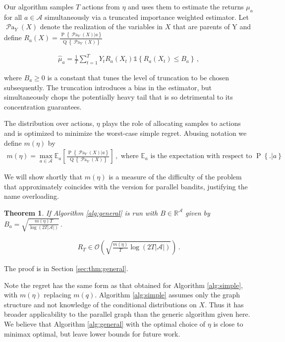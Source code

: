 \documentclass[11pt,a4paper,oneside]{book}
\newcommand{\simpleregret}{R_T}
\newcommand{\Q}[1]{\operatorname{Q}\left\{#1\right\}}
\newcommand{\EE}{\mathbb E}
\newcommand{\EEa}{\EE_a}
\newcommand{\Pn}[2]{\operatorname{P}\left\{#2|#1\right\}}
\newcommand{\calA}{\mathcal A}
\newcommand{\R}{\mathbb R}
\newcommand{\set}[1]{\left\{#1\right\}}
\newcommand{\ind}[1]{\mathds{1}\!\!\set{#1}}
\newcommand{\eq}[1]{\begin{align*}#1\end{align*}}
\newcommand{\bigo}[1]{\mathcal{O}\left( #1 \right)}
\newcommand{\parents}[1]{\operatorname{\mathcal{P}a}_{#1}}
\newtheorem{theorem}{Theorem}
\begin{document}
Our algorithm samples $T$ actions from $\eta$ and uses them to estimate the returns $\mu_a$ for all $a \in \calA$ simultaneously via a truncated importance weighted estimator. Let $\parents{Y}(X)$ denote the realization of the variables in $X$ that are parents of Y and define $R_a(X) = \frac{\Pn{a}{\parents{Y}(X)}}{\Q{\parents{Y}(X)}}$

\eq {
\hat \mu_a =  \frac{1}{T} \sum_{t=1}^T Y_t R_a(X_t)  \ind{R_a(X_t) \leq B_a}\,, 
} 

where $ B_a \geq 0$  is a constant that tunes the level of truncation to be chosen subsequently. The truncation introduces a bias in the estimator, but simultaneously chops the potentially heavy tail that is so detrimental to its concentration guarantees. 

The distribution over actions, $\eta$ plays the role of allocating samples to actions and is optimized to minimize the worst-case simple regret. Abusing notation we define $m(\eta)$ by
\eq{
m(\eta) = \max_{a \in \calA} \EEa\left[\frac{\Pn{a}{\parents{Y}(X)}}{\Q{\parents{Y}(X)}}\right]\,,\text{ where } \EEa \text{ is the expectation with respect to } \Pn{a}.
}

We will show shortly that $m(\eta)$ is a measure of the difficulty of the problem that approximately coincides with the version for parallel bandits, justifying the name overloading.

\begin{theorem}\label{thm:general}
If Algorithm \ref{alg:general} is run with $B \in \R^{\calA}$ given by $B_a = \sqrt{\frac{m(\eta)T}{\log\left(2T|\calA|\right)}}\,.$

\eq{
\simpleregret \in \bigo{\sqrt{\frac{m(\eta)}{T} \log\left(2T|\calA|\right)}}\,.
}
\end{theorem}

The proof is in Section \ref{sec:thm:general}.

Note the regret has the same form as that obtained for Algorithm \ref{alg:simple}, with $m(\eta)$ replacing $m(q)$. Algorithm \ref{alg:simple} assumes only the graph structure and not knowledge of the conditional distributions on $X$. Thus it has broader applicability to the parallel graph than the generic algorithm given here. We believe that Algorithm \ref{alg:general} with the optimal choice of $\eta$ is close to minimax optimal, but leave lower bounds
for future work.
\end{document}
